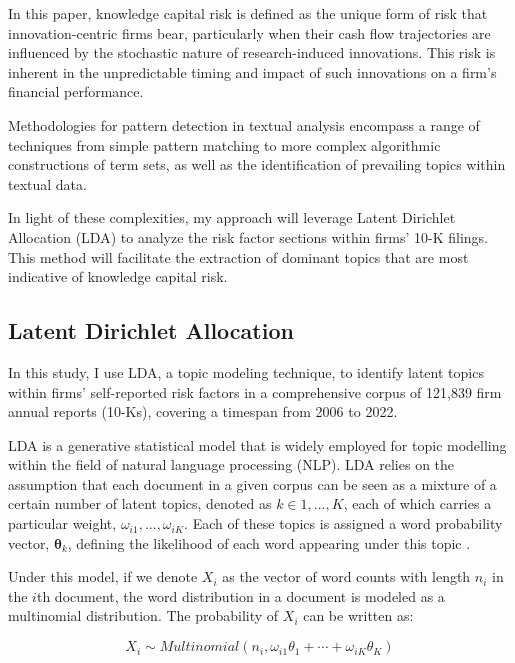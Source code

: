 \documentclass[12pt, letterpaper]{article}
\begin{document}
In this paper, knowledge capital risk is defined as the unique form of risk that innovation-centric firms bear, particularly when their cash flow trajectories are influenced by the stochastic nature of research-induced innovations. This risk is inherent in the unpredictable timing and impact of such innovations on a firm's financial performance.

Methodologies for pattern detection in textual analysis encompass a range of techniques from simple pattern matching to more complex algorithmic constructions of term sets, as well as the identification of prevailing topics within textual data.

In light of these complexities, my approach will leverage Latent Dirichlet Allocation (LDA) to analyze the risk factor sections within firms' 10-K filings. This method will facilitate the extraction of dominant topics that are most indicative of knowledge capital risk. 

\subsection{Latent Dirichlet Allocation}

In this study, I use LDA, a topic modeling technique, to identify latent topics within firms' self-reported risk factors in a comprehensive corpus of 121,839 firm annual reports (10-Ks), covering a timespan from 2006 to 2022.


LDA is a generative statistical model that is widely employed for topic modelling within the field of natural language processing (NLP). LDA relies on the assumption that each document in a given corpus can be seen as a mixture of a certain number of latent topics, denoted as $k \in {1, ..., K}$, each of which carries a particular weight, $\omega_{i1}, ..., \omega_{iK}$. Each of these topics is assigned a word probability vector, $\mathbf{\theta}_k$, defining the likelihood of each word appearing under this topic \citep{Blei2003-ay}.

Under this model, if we denote $X_i$ as the vector of word counts with length $n_i$ in the $i$th document, the word distribution in a document is modeled as a multinomial distribution. The probability of $X_i$ can be written as:

\begin{equation}
X_i \sim Multinomial\left(n_i, \omega_{i 1} \theta_1+\cdots+\omega_{i K} \theta_K\right)
\end{equation}

\end{document}
